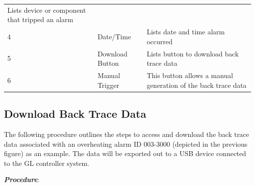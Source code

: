 \begin{longtable}[]{@{}lll@{}}
\begin{minipage}[t]{0.65\columnwidth}
Lists device or component that tripped an alarm\strut
\end{minipage}\tabularnewline
\begin{minipage}[t]{0.04\columnwidth}\raggedright
4\strut
\end{minipage} & \begin{minipage}[t]{0.23\columnwidth}\raggedright
Date/Time\strut
\end{minipage} & \begin{minipage}[t]{0.65\columnwidth}\raggedright
Lists date and time alarm occurred\strut
\end{minipage}\tabularnewline
\begin{minipage}[t]{0.04\columnwidth}\raggedright
5\strut
\end{minipage} & \begin{minipage}[t]{0.23\columnwidth}\raggedright
Download Button\strut
\end{minipage} & \begin{minipage}[t]{0.65\columnwidth}\raggedright
Lists button to download back trace data\strut
\end{minipage}\tabularnewline
\begin{minipage}[t]{0.04\columnwidth}\raggedright
6\strut
\end{minipage} & \begin{minipage}[t]{0.23\columnwidth}\raggedright
Manual Trigger\strut
\end{minipage} & \begin{minipage}[t]{0.65\columnwidth}\raggedright
This button allows a manual generation of the back trace data\strut
\end{minipage}\tabularnewline
\bottomrule
\end{longtable}


\subsection{Download Back Trace
Data}

The following procedure outlines the steps to access and download the
back trace data associated with an overheating alarm ID 003-3000
(depicted in the previous figure) as an example. The data will be
exported out to a USB device connected to the GL controller system.

\textbf{\emph{Procedure}}:

